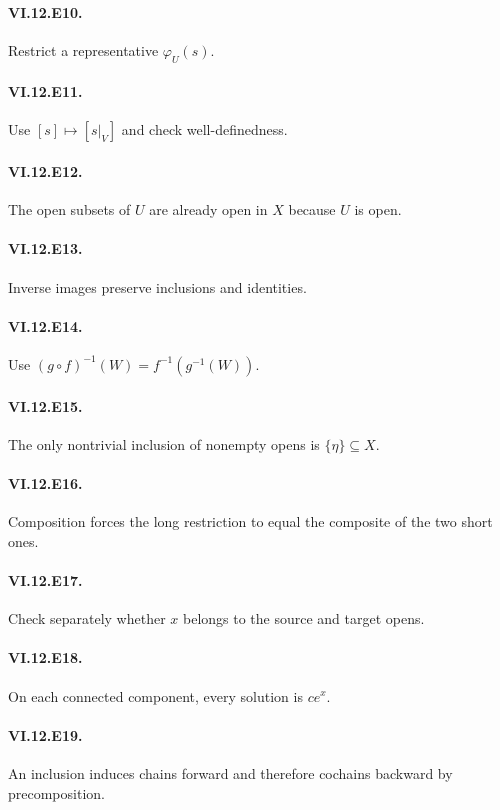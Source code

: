 \paragraph{VI.12.E10.} Restrict a representative $\varphi_U(s)$.

\paragraph{VI.12.E11.} Use $[s]\mapsto[s|_V]$ and check well-definedness.

\paragraph{VI.12.E12.} The open subsets of $U$ are already open in $X$ because $U$ is open.

\paragraph{VI.12.E13.} Inverse images preserve inclusions and identities.

\paragraph{VI.12.E14.} Use $(g\circ f)^{-1}(W)=f^{-1}(g^{-1}(W))$.

\paragraph{VI.12.E15.} The only nontrivial inclusion of nonempty opens is $\{\eta\}\subseteq X$.

\paragraph{VI.12.E16.} Composition forces the long restriction to equal the composite of the two short ones.

\paragraph{VI.12.E17.} Check separately whether $x$ belongs to the source and target opens.

\paragraph{VI.12.E18.} On each connected component, every solution is $ce^x$.

\paragraph{VI.12.E19.} An inclusion induces chains forward and therefore cochains backward by precomposition.

